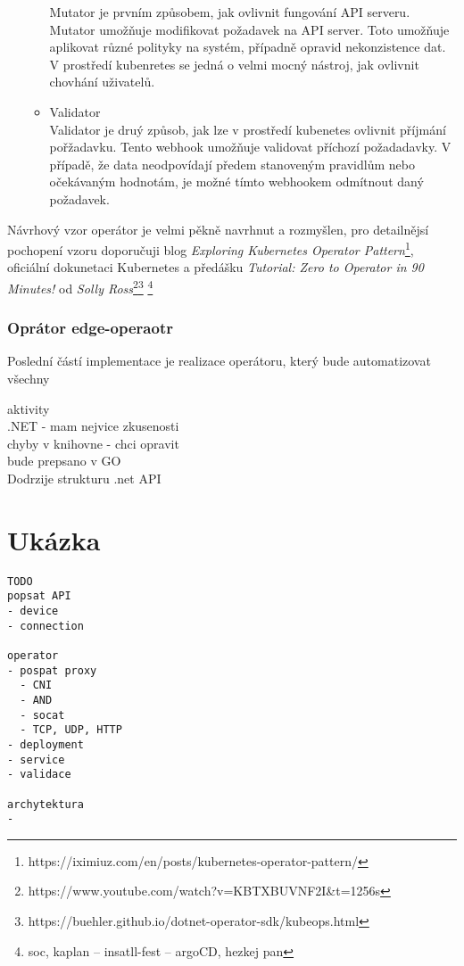 \begin{itemize}
\begin{itemize}
        Mutator je prvním způsobem, jak ovlivnit fungování API serveru. Mutator umožňuje modifikovat požadavek na API server. Toto umožňuje aplikovat různé polityky na systém, případně opravid nekonzistence dat. V prostředí kubenretes se jedná o velmi mocný nástroj, jak ovlivnit chovhání uživatelů.  
        \item Validator\\
        Validator je druý způsob, jak lze v prostředí kubenetes ovlivnit příjmání pořžadavku. Tento webhook umožňuje validovat příchozí požadadavky. V případě, že data neodpovídají předem stanoveným pravidlům nebo očekávaným hodnotám, je možné tímto webhookem odmítnout daný požadavek.
    \end{itemize}
\end{itemize}
Návrhový vzor operátor je velmi pěkně navrhnut a rozmyšlen, pro detailnějsí pochopení vzoru doporučuji blog \textit{Exploring Kubernetes Operator Pattern}\footnote{https://iximiuz.com/en/posts/kubernetes-operator-pattern/}, oficiální dokunetaci Kubernetes a předášku \textit{Tutorial: Zero to Operator in 90 Minutes!} od \textit{Solly Ross}\footnote{https://www.youtube.com/watch?v=KBTXBUVNF2I\&t=1256s}\footnote{https://buehler.github.io/dotnet-operator-sdk/kubeops.html} 
\footnote{soc, kaplan -- insatll-fest -- argoCD, hezkej pan}\cite{velichko_2021_exploring}

\subsubsection{Oprátor edge-operaotr}
Poslední částí implementace je realizace operátoru, který bude automatizovat všechny 

aktivity\\
.NET - mam nejvice zkusenosti\\
chyby v knihovne - chci opravit\\
bude prepsano v GO\\
Dodrzije strukturu .net API\\

\section{Ukázka}



\begin{verbatim}
TODO
popsat API
- device
- connection

operator
- pospat proxy
  - CNI
  - AND
  - socat
  - TCP, UDP, HTTP
- deployment
- service
- validace

archytektura
- 
\end{verbatim}